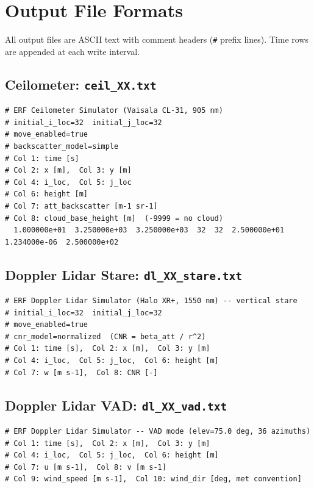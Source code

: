 \documentclass[11pt,letterpaper]{article}
\begin{document}
\section{Output File Formats}

All output files are ASCII text with comment headers (\texttt{\#} prefix lines).
Time rows are appended at each write interval.

\subsection{Ceilometer: \texttt{ceil\_XX.txt}}
\begin{lstlisting}
# ERF Ceilometer Simulator (Vaisala CL-31, 905 nm)
# initial_i_loc=32  initial_j_loc=32
# move_enabled=true
# backscatter_model=simple
# Col 1: time [s]
# Col 2: x [m],  Col 3: y [m]
# Col 4: i_loc,  Col 5: j_loc
# Col 6: height [m]
# Col 7: att_backscatter [m-1 sr-1]
# Col 8: cloud_base_height [m]  (-9999 = no cloud)
  1.000000e+01  3.250000e+03  3.250000e+03  32  32  2.500000e+01  1.234000e-06  2.500000e+02
\end{lstlisting}

\subsection{Doppler Lidar Stare: \texttt{dl\_XX\_stare.txt}}
\begin{lstlisting}
# ERF Doppler Lidar Simulator (Halo XR+, 1550 nm) -- vertical stare
# initial_i_loc=32  initial_j_loc=32
# move_enabled=true
# cnr_model=normalized  (CNR = beta_att / r^2)
# Col 1: time [s],  Col 2: x [m],  Col 3: y [m]
# Col 4: i_loc,  Col 5: j_loc,  Col 6: height [m]
# Col 7: w [m s-1],  Col 8: CNR [-]
\end{lstlisting}

\subsection{Doppler Lidar VAD: \texttt{dl\_XX\_vad.txt}}
\begin{lstlisting}
# ERF Doppler Lidar Simulator -- VAD mode (elev=75.0 deg, 36 azimuths)
# Col 1: time [s],  Col 2: x [m],  Col 3: y [m]
# Col 4: i_loc,  Col 5: j_loc,  Col 6: height [m]
# Col 7: u [m s-1],  Col 8: v [m s-1]
# Col 9: wind_speed [m s-1],  Col 10: wind_dir [deg, met convention]
\end{lstlisting}
\end{document}
